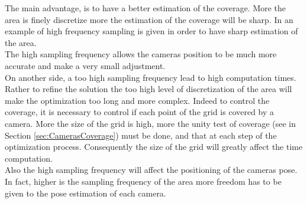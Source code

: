 %
The main advantage, is to have a better estimation of the coverage. More the area is finely discretize more the estimation of the coverage will be sharp. In \citep{171*horster2006} an example of high frequency sampling is given in order to have sharp estimation of the area. \\
The high sampling frequency allows the cameras position to be much more accurate and make a very small adjustment.
\\On another side, a too high sampling frequency lead to high computation times. Rather to refine the solution the too high level of discretization of the area will make the optimization too long and more complex. Indeed to control the coverage, it is necessary to control if each point of the grid is covered by a camera.  
 More the size of the grid is high, more the unity test of coverage (see in Section \ref{sec:CamerasCoverage}) must be done, and that at each step of the optimization process. Consequently the size of the grid will greatly affect the time computation.  \\
Also the high sampling frequency will affect the positioning of the cameras pose. In fact, higher is the sampling frequency of the area  more freedom has to be given to the  pose estimation of  each camera.



